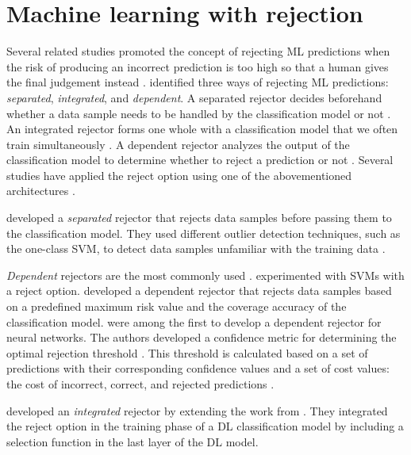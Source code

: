 \section{Machine learning with rejection}
\label{sec:related-work-rejection}
Several related studies promoted the concept of rejecting ML predictions when the risk of producing an incorrect prediction is too high so that a human gives the final judgement instead \citep{sayin2021science, hendrickx2021machine, woo2020future}.
%
\citet{hendrickx2021machine} identified three ways of rejecting ML predictions: \emph{separated}, \emph{integrated}, and \emph{dependent}.
%
A separated rejector decides beforehand whether a data sample needs to be handled by the classification model or not \citep{hendrickx2021machine}.
%
An integrated rejector forms one whole with a classification model that we often train simultaneously \citep{hendrickx2021machine}.
%
A dependent rejector analyzes the output of the classification model to determine whether to reject a prediction or not \citep{hendrickx2021machine}.
%
Several studies have applied the reject option using one of the abovementioned architectures \citep{coenen2020probability, grandvalet2008reject, Geifman2017Selective, geifman2019reject, de2000reject}.
%

%
\citet{coenen2020probability} developed a \emph{separated} rejector that rejects data samples before passing them to the classification model.
%
They used different outlier detection techniques, such as the one-class SVM, to detect data samples unfamiliar with the training data \citep{coenen2020probability}.
%

%
\emph{Dependent} rejectors are the most commonly used \citep{Geifman2017Selective, de2000reject, grandvalet2008reject}.
%
\citet{grandvalet2008reject} experimented with SVMs with a reject option.
%
\citet{Geifman2017Selective} developed a dependent rejector that rejects data samples based on a predefined maximum risk value and the coverage accuracy of the classification model.
%
\citet{de2000reject} were among the first to develop a dependent rejector for neural networks.
%
The authors developed a confidence metric for determining the optimal rejection threshold \citep{de2000reject}.
%
This threshold is calculated based on a set of predictions with their corresponding confidence values and a set of cost values: the cost of incorrect, correct, and rejected predictions \citep{de2000reject}.
%

%
\citet{geifman2019reject} developed an \emph{integrated} rejector by extending the work from \citet{Geifman2017Selective}.
%
They integrated the reject option in the training phase of a DL classification model by including a selection function in the last layer of the DL model.
%

